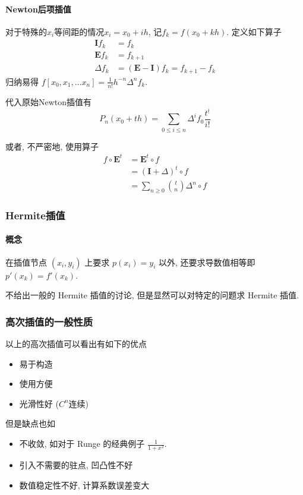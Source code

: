 \documentclass{ctexart}
\begin{document}
\paragraph{Newton后项插值}
    对于特殊的$x_i$等间距的情况$x_i = x_0 + ih$, 记$f_k = f(x_0+kh)$. 定义如下算子\begin{align*}
        \mathbf{I} f_k &= f_k\\
        \mathbf{E} f_k &= f_{k+1}\\
        \Delta f_k & = (\mathbf{E} - \mathbf{I}) f_k = f_{k+1}-f_k
    \end{align*}
    归纳易得 $f[x_0,x_1,\ldots x_n] = \frac{1}{n!} h^{-n} \Delta^n f_k$.\par
    代入原始Newton插值有 \[
        P_n(x_0 + th) = \sum_{0\le i\le n} \Delta^i f_0 \frac{t^{\underline{i}}}{i!}\]
    \par
    或者, 不严密地, 使用算子 \begin{align*}
        f \circ \mathbf{E}^t &= \mathbf{E}^t \circ f \\
        &= (\mathbf{I} + \Delta)^t \circ f \\
        &= \sum_{n \ge 0} {t \choose n} \Delta^n \circ f
    \end{align*}
\subsubsection{Hermite插值}
\paragraph{概念}
    在插值节点 $(x_i, y_i)$ 上要求 $p(x_i) = y_i$ 以外,
    还要求导数值相等即 $p'(x_k) = f'(x_k)$.\par
    不给出一般的 Hermite 插值的讨论,
    但是显然可以对特定的问题求 Hermite 插值.
\subsubsection{高次插值的一般性质}
    以上的高次插值可以看出有如下的优点 \begin{itemize}
        \item 易于构造
        \item 使用方便
        \item 光滑性好 ($C^n$连续)
    \end{itemize}
    但是缺点也如 \begin{itemize}
        \item 不收敛, 如对于 Runge 的经典例子 $\frac{1}{1+x^2}$.
        \item 引入不需要的驻点, 凹凸性不好
        \item 数值稳定性不好, 计算系数误差变大
    \end{itemize}
\end{document}
